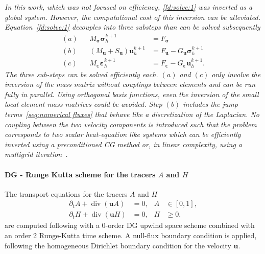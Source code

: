 \documentclass[11pt]{article}
\newcommand{\bu}{\mathbf{u}}
\newcommand{\sig}{\boldsymbol{\sigma}}
\newcommand{\beps}{\boldsymbol{\varepsilon}}
\begin{document}
\textit{In this work, which was not focused on efficiency, \eqref{fd:solve:1} was inverted as a global system. However, the computational cost of this inversion can be alleviated. Equation~\eqref{fd:solve:1} decouples into three substeps than can be solved subsequently 
\begin{equation}\label{fd:solve:3}
\begin{aligned}
(a)&&M_{\sig}\sig_h^{k+1} &= F_{\sig}\\
(b)&&(M_\bu+S_\bu) \bu_h^{k+1} &= F_\bu - G_\bu \sig_h^{k+1}\\
(c)&&M_{\beps} \beps_h^{k+1} &= F_{\beps} - G_{\beps} \bu_h^{k+1}.
\end{aligned}
\end{equation}
The three sub-steps can be solved efficiently each. $(a)$ and $(c)$ only involve the inversion of the mass matrix without couplings between elements and can be run fully in parallel. Using orthogonal basis functions, even the inversion of the small local element mass matrices could be avoided. Step $(b)$ includes the jump terms~\eqref{seq:numerical fluxes} that behave like a discretization of the Laplacian. No coupling between the two velocity components is introduced such that the problem corresponds to two scalar heat-equation like systems which can be efficiently inverted using a preconditioned CG method or, in linear complexity, using a multigrid iteration~\cite{MehlmannRichter2017mg}.}


\paragraph{DG - Runge Kutta scheme for the tracers $A$ and $H$}
The transport equations for the tracers $A$ and $H$
\begin{align}
    \partial_t A + \operatorname{div}(\bu A) &= 0, & A &\in [0,1],\\
    \partial_t H + \operatorname{div}(\bu H) &= 0, & H &\ge 0,
\end{align}
are computed following \cite{richter2023dynamical} with a 0-order DG upwind space scheme combined with an order 2 Runge-Kutta time scheme. A null-flux boundary condition is applied, following the homogeneous Dirichlet boundary condition for the velocity $\bu$.
\end{document}
